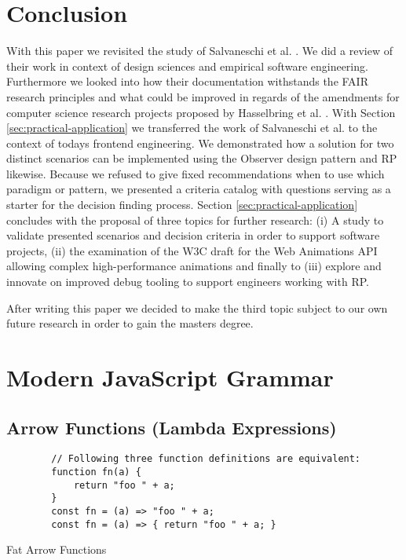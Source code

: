 \documentclass[12pt,a4paper]{article}
\begin{document}
\section{Conclusion}

With this paper we revisited the study of Salvaneschi et al. \cite{7827078}. We did a review of their work in context of design sciences and empirical software engineering. Furthermore we looked into how their documentation withstands the FAIR research principles and what could be improved in regards of the amendments for computer science research projects proposed by Hasselbring et al. \cite{2019arXiv190805986H}. With Section \ref{sec:practical-application} we  transferred the work of Salvaneschi et al. to the context of todays frontend engineering. We demonstrated how a solution for two distinct scenarios can be implemented using the Observer design pattern and RP likewise. Because we refused to give fixed recommendations when to use which paradigm or pattern, we presented a criteria catalog with questions serving as a starter for the decision finding process. Section \ref{sec:practical-application} concludes with the proposal of three topics for further research: (i) A study to validate presented scenarios and decision criteria in order to support software projects, (ii) the examination of the W3C draft for the Web Animations API allowing complex high-performance animations and finally to (iii) explore and innovate on improved debug tooling to support engineers working with RP.

After writing this paper we decided to make the third topic subject to our own future research in order to gain the masters degree.


\pagebreak

\appendix

\section{Modern JavaScript Grammar}
\label{sec:modern-javascript-grammar}

\subsection{Arrow Functions (Lambda Expressions)}
\begin{listing}[H]
	\begin{verbatim}
		// Following three function definitions are equivalent:
		function fn(a) {
			return "foo " + a;
		}
		const fn = (a) => "foo " + a;
		const fn = (a) => { return "foo " + a; }
	\end{verbatim}
	\caption{Fat Arrow Functions}
\end{listing}
\end{document}
